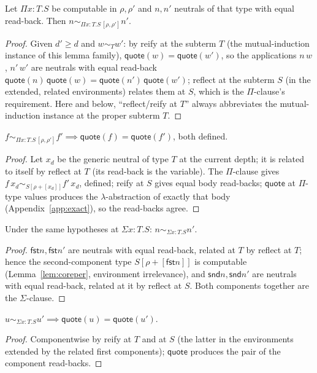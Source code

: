 \documentclass{lmcs}
\providecommand{\fst}{}\renewcommand{\fst}{\mathsf{fst}}
\providecommand{\snd}{}\renewcommand{\snd}{\mathsf{snd}}
\newcommand{\quo}{\mathsf{quote}}
\begin{document}
\begin{lem}[Reflect at $\Pi$]\label{lem:reflPi}
  Let $\Pi x{:}T.S$ be computable in $\rho, \rho'$ and $n, n'$
  neutrals of that type with equal read-back.  Then
  $n \sim_{\Pi x{:}T.S\,[\rho,\rho']} n'$.
\end{lem}
\begin{proof}
  Given $d' \ge d$ and $w \sim_{T} w'$: by reify at the subterm
  $T$ (the mutual-induction instance of this lemma family),
  $\quo(w) = \quo(w')$, so the applications $n\,w$, $n'\,w'$ are
  neutrals with equal read-back
  $\quo(n)\,\quo(w) = \quo(n')\,\quo(w')$; reflect at the subterm
  $S$ (in the extended, related environments) relates them at $S$,
  which is the $\Pi$-clause's requirement.  Here and below,
  ``reflect/reify at $T$'' always abbreviates the mutual-induction
  instance at the proper subterm $T$.
\end{proof}

\begin{lem}[Reify at $\Pi$]\label{lem:reifPi}
  $f \sim_{\Pi x{:}T.S\,[\rho,\rho']} f' \implies
  \quo(f) = \quo(f')$, both defined.
\end{lem}
\begin{proof}
  Let $x_d$ be the generic neutral of type $T$ at the current
  depth; it is related to itself by reflect at $T$ (its read-back
  is the variable).  The $\Pi$-clause gives
  $f\,x_d \sim_{S[\rho+[x_d]]} f'\,x_d$, defined; reify at $S$
  gives equal body read-backs; $\quo$ at $\Pi$-type values produces
  the $\lambda$-abstraction of exactly that body
  (Appendix~\ref{app:exact}), so the read-backs agree.
\end{proof}

\begin{lem}\label{lem:reflSig}
  Under the same hypotheses at $\Sigma x{:}T.S$:
  $n \sim_{\Sigma x{:}T.S} n'$.
\end{lem}
\begin{proof}
  $\fst n, \fst n'$ are neutrals with equal read-back, related at
  $T$ by reflect at $T$; hence the second-component type
  $S[\rho{+}[\fst n]]$ is computable
  (Lemma~\ref{lem:coreper}, environment irrelevance), and
  $\snd n, \snd n'$ are neutrals with equal read-back, related at
  it by reflect at $S$.  Both components together are the
  $\Sigma$-clause.
\end{proof}

\begin{lem}\label{lem:reifSig}
  $u \sim_{\Sigma x{:}T.S} u' \implies \quo(u) = \quo(u')$.
\end{lem}
\begin{proof}
  Componentwise by reify at $T$ and at $S$ (the latter in the
  environments extended by the related first components); $\quo$
  produces the pair of the component read-backs.
\end{proof}
\end{document}
